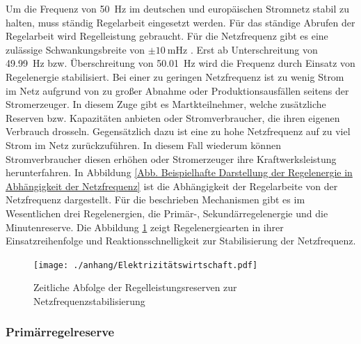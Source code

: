 		Um die Frequenz von \SI{50}{\hertz} im deutschen und europäischen Stromnetz stabil zu halten, muss ständig Regelarbeit eingesetzt werden.
		Für das ständige Abrufen der Regelarbeit wird Regelleistung gebraucht.
		Für die Netzfrequenz gibt es eine zulässige Schwankungsbreite von $\pm\SI{10}{\milli\hertz}$ \parencite{Angerer_Krohns}.
		Erst ab Unterschreitung von \SI{49,99}{\hertz} bzw. Überschreitung von \SI{50,01}{\hertz} wird die Frequenz durch Einsatz von Regelenergie stabilisiert.
		Bei einer zu geringen Netzfrequenz ist zu wenig Strom im Netz aufgrund von zu großer Abnahme oder Produktionsausfällen seitens der Stromerzeuger.
		In diesem Zuge gibt es Martkteilnehmer, welche zusätzliche Reserven bzw. Kapazitäten anbieten oder Stromverbraucher, die ihren eigenen Verbrauch drosseln.
		Gegensätzlich dazu ist eine zu hohe Netzfrequenz auf zu viel Strom im Netz zurückzuführen. 
		In diesem Fall wiederum können Stromverbraucher diesen erhöhen oder Stromerzeuger ihre Kraftwerksleistung herunterfahren. 
		In Abbildung \ref{Abb. Beispielhafte Darstellung der Regelenergie in Abhängigkeit der Netzfrequenz} ist die Abhängigkeit der Regelarbeite von der Netzfrequenz dargestellt.
		Für die beschrieben Mechanismen gibt es im Wesentlichen drei Regelenergien, die Primär-, Sekundärregelenergie und die Minutenreserve.
		Die Abbildung \ref{Abb. Reaktionskette Regelenergien} zeigt Regelenergiearten in ihrer Einsatzreihenfolge und Reaktionsschnelligkeit zur Stabilisierung der Netzfrequenz. 
		
		\begin{figure} [H]
			\centering
			\label{Abb. Reaktionskette Regelenergien}
			\texttt{[image: ./anhang/Elektrizitätswirtschaft.pdf]}
			\caption{Zeitliche Abfolge der Regelleistungsreserven zur Netzfrequenzstabilisierung \parencite{Elektrizitätswirtschaft}}
		\end{figure}
		
		\subsubsection{Primärregelreserve} \label{sect: Primärregelreserve}
		
